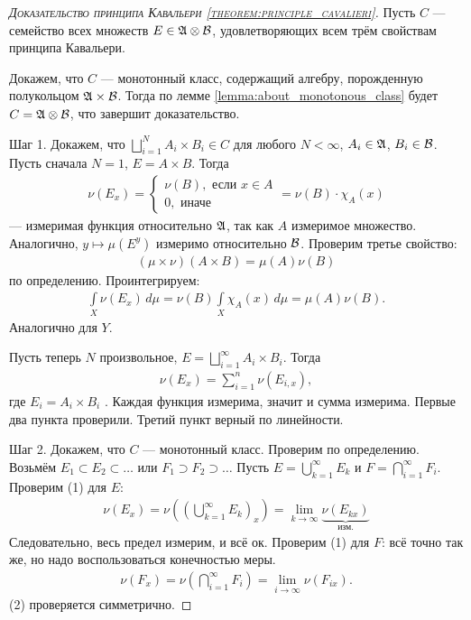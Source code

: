 \begin{proof}[\normalfont\textsc{Доказательство принципа Кавальери \ref{theorem:principle_cavalieri}}]
 Пусть $C$ --- семейство всех множеств $E \in \mathfrak{A} \otimes \mathcal{B}$, удовлетворяющих всем трём  свойствам принципа Кавальери.

 Докажем, что $C$  --- монотонный класс, содержащий алгебру, порожденную полукольцом $\mathfrak{A} \times \mathcal{B}$. Тогда по лемме \ref{lemma:about_monotonous_class} будет $C = \mathfrak{A} \otimes \mathcal{B}$, что завершит доказательство.

 Шаг 1. Докажем, что $\bigsqcup_{i=1}^{N} A_i \times B_i \in C $  для любого $N < \infty$, $A_i \in \mathfrak{A}$, $B_i \in \mathcal{B}$. Пусть сначала $N = 1$, $E = A \times B$. Тогда \begin{align*}
  \nu(E_x) = \begin{cases}
   \nu(B), \text{ если } x \in A  \\
   0, \text{ иначе }
  \end{cases} = \nu(B) \cdot \chi_A(x)
 \end{align*} --- измеримая функция относительно $\mathfrak{A}$, так как $A$  измеримое множество. Аналогично, $y \mapsto \mu(E^{y})$ измеримо относительно $\mathcal{B}$. Проверим третье свойство:  \begin{align*}
 (\mu \times \nu)(A \times B) = \mu(A) \nu(B) 
 \end{align*} по определению. Проинтегрируем: \begin{align*}
  \int\limits_{X} \nu(E_x) \, d\mu   = \nu(B) \int\limits_{X} \chi_A(x) \, d\mu   = \mu(A) \nu(B)
 .\end{align*} Аналогично для $Y$.

 Пусть теперь $N$ произвольное, $E = \bigsqcup_{i=1}^{\infty} A_i \times B_i $. Тогда \begin{align*}
  \nu(E_x) = \sum_{i=1}^{n} \nu(E_{i,x})
 ,\end{align*} где $E_i = A_i \times B_i$ . Каждая функция измерима, значит и сумма измерима. Первые два пункта проверили. Третий пункт верный по линейности.

 Шаг 2. Докажем, что $C$  --- монотонный класс. Проверим по определению. Возьмём $E_1 \subset E_2 \subset \ldots$  или $F_1 \supset F_2 \supset \ldots$  Пусть $E = \bigcup_{k=1}^{\infty} E_k$ и $F = \bigcap_{i=1}^{\infty} F_i $. Проверим (1) для $E$: \begin{align*}
  \nu (E_x) = \nu \left( \left( \bigcup_{k=1}^{\infty} E_k \right)_x \right) = \lim_{k \to \infty} \underbrace{\nu(E_{kx})}_{\text{ изм. }} 
 \end{align*} Следовательно, весь предел измерим, и всё ок. Проверим (1) для $F$: всё точно так же, но надо воспользоваться конечностью меры. \begin{align*}
 \nu(F_x) = \nu \left( \bigcap_{i=1}^{\infty} F_i \right) = \lim_{i \to \infty} \nu(F_{ix}) 
 .\end{align*} (2) проверяется симметрично.


\end{proof}
